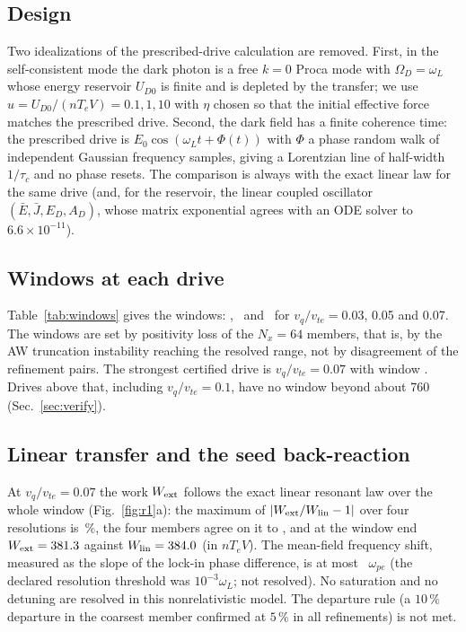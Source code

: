 \documentclass[aps,pre,reprint,floatfix,amsmath,amssymb,nofootinbib,superscriptaddress]{revtex4-2}
\newcommand{\vq}{v_q/v_{te}}
\newcommand{\nTV}{nT_eV}
\newcommand{\wpe}{\omega_{pe}}
\newcommand{\Wext}{W_{\rm ext}}
\newcommand{\Wlin}{W_{\rm lin}}
\begin{document}
\subsection{Design}
Two idealizations of the prescribed-drive calculation are removed. First, in the self-consistent mode the dark photon is a free $k=0$ Proca mode with $\Omega_D=\omega_L$ whose energy reservoir $U_{D0}$ is finite and is depleted by the transfer; we use $u=U_{D0}/(\nTV)=0.1,1,10$ with $\eta$ chosen so that the initial effective force matches the prescribed drive. Second, the dark field has a finite coherence time: the prescribed drive is $E_0\cos(\omega_Lt+\Phi(t))$ with $\Phi$ a phase random walk of independent Gaussian frequency samples, giving a Lorentzian line of half-width $1/\tau_c$ and no phase resets. The comparison is always with the exact linear law for the same drive (and, for the reservoir, the linear coupled oscillator $(\bar E,\bar J,E_D,A_D)$, whose matrix exponential agrees with an ODE solver to $6.6\times10^{-11}$).

\subsection{Windows at each drive}
\begin{table}[t]
\caption{Certified windows for the strong-drive set-up with closure $c=64$ integrated exactly. Members: $(N_x,N_n)=(32,64),(64,64),(32,128),(64,128)$ and $(32,64)$ at $c=32$. The window is the minimum of refinement-pair times, positivity times, times reached and the cap $T=1000$; the grid column is the masked spectral-grid reference (reported, not part of the window).}\label{tab:windows}
\tabWindows
\end{table}
Table~\ref{tab:windows} gives the windows: \winA, \winB\ and \winC\ for $\vq=0.03$, 0.05 and 0.07. The windows are set by positivity loss of the $N_x=64$ members, that is, by the AW truncation instability reaching the resolved range, not by disagreement of the refinement pairs. The strongest certified drive is $\vq=0.07$ with window \winC. Drives above that, including $\vq=0.1$, have no window beyond about 760 (Sec.~\ref{sec:verify}).

\subsection{Linear transfer and the seed back-reaction}
At $\vq=0.07$ the work $\Wext$ follows the exact linear resonant law over the whole window (Fig.~\ref{fig:r1}a): the maximum of $|\Wext/\Wlin-1|$ over four resolutions is \rnlBound\,\%, the four members agree on it to \rnlSpread, and at the window end $\Wext=\rnlWext$ against $\Wlin=\rnlWlin$ (in $\nTV$). The mean-field frequency shift, measured as the slope of the lock-in phase difference, is at most \rnlDw\ $\wpe$ (the declared resolution threshold was $10^{-3}\omega_L$; not resolved). No saturation and no detuning are resolved in this nonrelativistic model. The departure rule (a $10\,\%$ departure in the coarsest member confirmed at $5\,\%$ in all refinements) is not met.
\end{document}
